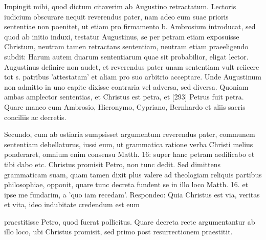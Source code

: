 Impingit mihi, quod dictum citaverim ab Augustino retractatum. Lectoris iudicium obscurare nequit reverendus pater, nam adeo eum suae prioris sententiae non poenitet, ut etiam pro firmamento b. Ambrosium introducat, sed quod ab initio induxi, testatur Augustinus, se per petram etiam exposuisse Christum, neutram tamen retractans sententiam, neutram etiam praeeligendo subdit: Harum autem duarum sententiarum quae sit probabilior, eligat lector. Augustinus definire non audet, et reverendus pater unam sententiam vult reiicere tot s. patribus 'attestatam' et aliam pro suo arbitrio acceptare. Unde Augustinum non admitto in uno capite dixisse contraria vel adversa, sed diversa. Quoniam ambas amplector sententias, et Christus est petra, et [293] Petrus fuit petra. Quare maneo cum Ambrosio, Hieronymo, Cypriano, Bernhardo et aliis sacris conciliis ac decretis.

Secundo, cum ab ostiaria sumpsisset argumentum reverendus pater, communem sententiam debellaturus, iussi eum, ut grammatica ratione verba Christi melius ponderaret, omnium enim consensu Matth. 16: super hanc petram aedificabo et tibi dabo etc. Christus promisit Petro, non tunc dedit. Sed dimittens grammaticam suam, quam tamen dixit plus valere ad theologiam reliquis partibus philosophiae, opponit, quare tunc decreta fundent se in illo loco Matth. 16. et ipse me fundarim, a 'quo iam recedam'. Respondeo: Quia Christus est via, veritas et vita, ideo indubitate credendum est eum

praestitisse Petro, quod fuerat pollicitus. Quare decreta recte argumentantur ab illo loco, ubi Christus promisit, sed primo post resurrectionem praestitit.

